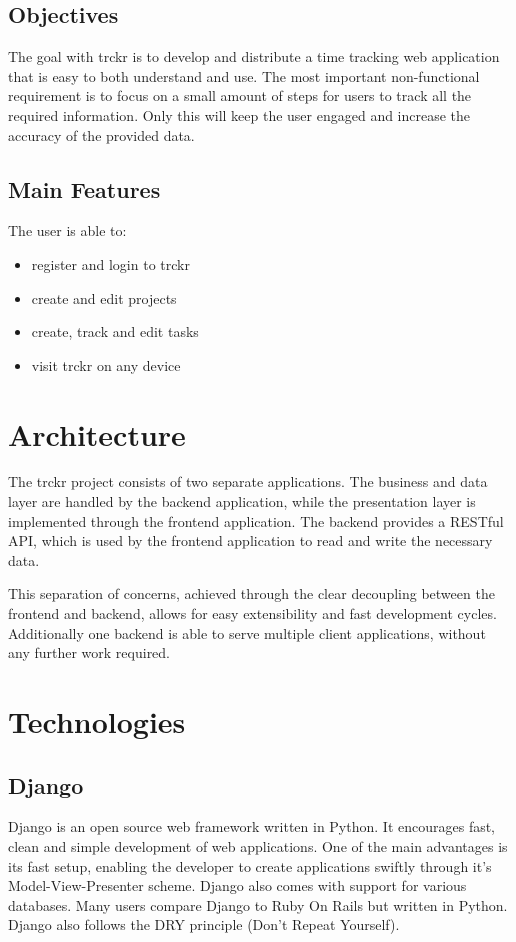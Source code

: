 \documentclass[bibliography=totoc, listof=totocnumbered]{scrartcl}
\begin{document}
\subsection{Objectives}
The goal with trckr is to develop and distribute a time tracking web application
that is easy to both understand and use. The most important non-functional
requirement is to focus on a small amount of steps for users to track all the
required information.
Only this will keep the user engaged and increase the accuracy of the provided
data.

\subsection{Main Features}
The user is able to:
\begin{itemize}
    \item register and login to trckr
    \item create and edit projects
    \item create, track and edit tasks
    \item visit trckr on any device
\end{itemize}

\section{Architecture}
The trckr project consists of two separate applications. The business and data layer are  handled by the backend application, while the presentation layer is implemented through the frontend application. The backend provides a RESTful API, which is used by the frontend application to read and write the necessary data.

This separation of concerns, achieved through the clear decoupling between the frontend and backend, allows for easy extensibility and fast development cycles. Additionally one backend is able to serve multiple client applications, without any further work required.

\section{Technologies}
\subsection{Django}
Django is an open source web framework written in Python.\cite{django} It encourages fast,
clean and simple development of web applications. One of the main advantages is
its fast setup, enabling the developer to create applications swiftly through
it's Model-View-Presenter scheme. Django also comes with support for various
databases. Many users compare Django to Ruby On Rails but written in Python.
Django also follows the DRY principle (Don't Repeat Yourself).
\end{document}
